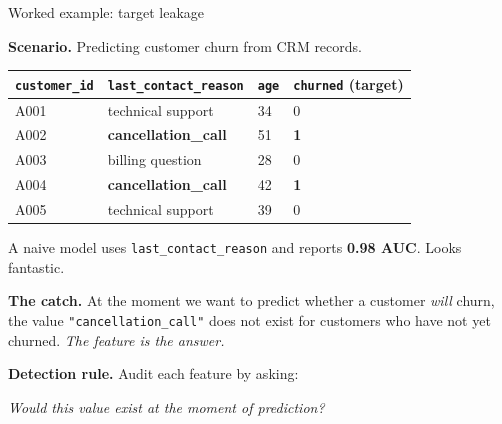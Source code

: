 \documentclass[10pt,compress,t,notes=noshow, xcolor=table]{beamer}
\begin{document}
\begin{frame}{Worked example: target leakage}
\label{leakage-target}

\textbf{Scenario.} Predicting customer churn from CRM records.

\medskip

\footnotesize
\begin{tabular}{|l|l|l|l|}
\hline
\rowcolor{gray!20}
\texttt{customer\_id} & \texttt{last\_contact\_reason} & \texttt{age} & \texttt{churned} (target) \\
\hline
A001 & technical support & 34 & 0 \\
A002 & \textbf{\textcolor{leakred}{cancellation\_call}} & 51 & \textbf{\textcolor{leakred}{1}} \\
A003 & billing question & 28 & 0 \\
A004 & \textbf{\textcolor{leakred}{cancellation\_call}} & 42 & \textbf{\textcolor{leakred}{1}} \\
A005 & technical support & 39 & 0 \\
\hline
\end{tabular}

\medskip
\normalsize

A naive model uses \texttt{last\_contact\_reason} and reports \textbf{0.98 AUC}. Looks fantastic.

\bigskip

\textbf{The catch.} At the moment we want to predict whether a customer \textit{will} churn, the value \texttt{"cancellation\_call"} does not exist for customers who have not yet churned. \emph{The feature is the answer.}

\medskip

\textbf{Detection rule.} Audit each feature by asking:
\begin{center}
\textit{Would this value exist at the moment of prediction?}
\end{center}

\end{frame}
\end{document}
